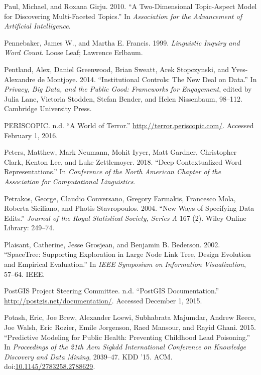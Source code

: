 \documentclass[]{krantz}
\begin{document}
\hypertarget{ref-paul-10}{}
Paul, Michael, and Roxana Girju. 2010. ``A Two-Dimensional Topic-Aspect
Model for Discovering Multi-Faceted Topics.'' In \emph{Association for
the Advancement of Artificial Intelligence}.

\hypertarget{ref-pennebaker-99}{}
Pennebaker, James W., and Martha E. Francis. 1999. \emph{Linguistic
Inquiry and Word Count}. Loose Leaf; Lawrence Erlbaum.

\hypertarget{ref-Pentland2014}{}
Pentland, Alex, Daniel Greenwood, Brian Sweatt, Arek Stopczynski, and
Yves-Alexandre de Montjoye. 2014. ``Institutional Controls: The New Deal
on Data.'' In \emph{Privacy, Big Data, and the Public Good: Frameworks
for Engagement}, edited by Julia Lane, Victoria Stodden, Stefan Bender,
and Helen Nissenbaum, 98--112. Cambridge University Press.

\hypertarget{ref-worldterror}{}
PERISCOPIC. n.d. ``A World of Terror.''
\url{http://terror.periscopic.com/}. Accessed February 1, 2016.

\hypertarget{ref-peters-18}{}
Peters, Matthew, Mark Neumann, Mohit Iyyer, Matt Gardner, Christopher
Clark, Kenton Lee, and Luke Zettlemoyer. 2018. ``Deep Contextualized
Word Representations.'' In \emph{Conference of the North American
Chapter of the Association for Computational Linguistics}.

\hypertarget{ref-petrakos2004new}{}
Petrakos, George, Claudio Conversano, Gregory Farmakis, Francesco Mola,
Roberta Siciliano, and Photis Stavropoulos. 2004. ``New Ways of
Specifying Data Edits.'' \emph{Journal of the Royal Statistical Society,
Series A} 167 (2). Wiley Online Library: 249--74.

\hypertarget{ref-plaisant2002spacetree}{}
Plaisant, Catherine, Jesse Grosjean, and Benjamin B. Bederson. 2002.
``SpaceTree: Supporting Exploration in Large Node Link Tree, Design
Evolution and Empirical Evaluation.'' In \emph{IEEE Symposium on
Information Visualization}, 57--64. IEEE.

\hypertarget{ref-PostGISdoc}{}
PostGIS Project Steering Committee. n.d. ``PostGIS Documentation.''
\url{http://postgis.net/documentation/}. Accessed December 1, 2015.

\hypertarget{ref-Potash2015}{}
Potash, Eric, Joe Brew, Alexander Loewi, Subhabrata Majumdar, Andrew
Reece, Joe Walsh, Eric Rozier, Emile Jorgenson, Raed Mansour, and Rayid
Ghani. 2015. ``Predictive Modeling for Public Health: Preventing
Childhood Lead Poisoning.'' In \emph{Proceedings of the 21th Acm Sigkdd
International Conference on Knowledge Discovery and Data Mining},
2039--47. KDD '15. ACM.
doi:\href{https://doi.org/10.1145/2783258.2788629}{10.1145/2783258.2788629}.
\end{document}
